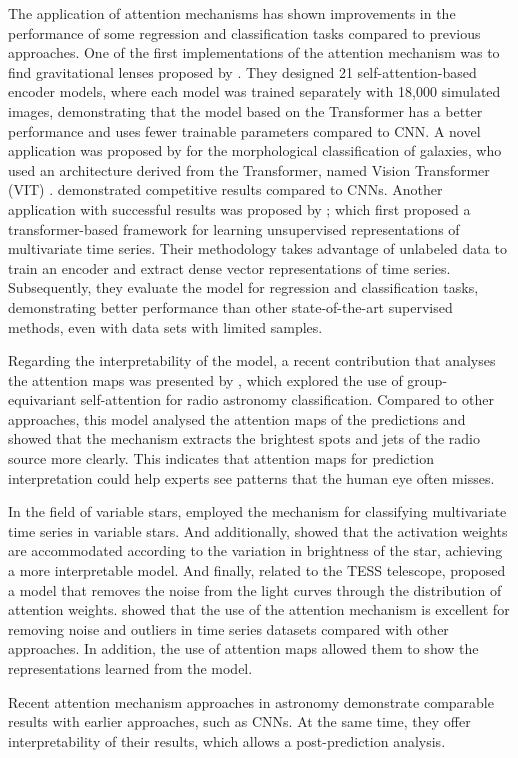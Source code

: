 The application of attention mechanisms has shown improvements in the performance of some regression and classification tasks compared to previous approaches. One of the first implementations of the attention mechanism was to find gravitational lenses proposed by \citet{thuruthipilly2021finding}. They designed 21 self-attention-based encoder models, where each model was trained separately with 18,000 simulated images, demonstrating that the model based on the Transformer has a better performance and uses fewer trainable parameters compared to CNN. A novel application was proposed by \citet{lin2021galaxy} for the morphological classification of galaxies, who used an architecture derived from the Transformer, named Vision Transformer (VIT) \citep{dosovitskiy2020image}. \citet{lin2021galaxy} demonstrated competitive results compared to CNNs. Another application with successful results was proposed by \citet{zerveas2021transformer}; which first proposed a transformer-based framework for learning unsupervised representations of multivariate time series. Their methodology takes advantage of unlabeled data to train an encoder and extract dense vector representations of time series. Subsequently, they evaluate the model for regression and classification tasks, demonstrating better performance than other state-of-the-art supervised methods, even with data sets with limited samples.

Regarding the interpretability of the model, a recent contribution that analyses the attention maps was presented by \citet{bowles20212}, which explored the use of group-equivariant self-attention for radio astronomy classification. Compared to other approaches, this model analysed the attention maps of the predictions and showed that the mechanism extracts the brightest spots and jets of the radio source more clearly. This indicates that attention maps for prediction interpretation could help experts see patterns that the human eye often misses. \par

In the field of variable stars, \citet{allam2021paying} employed the mechanism for classifying multivariate time series in variable stars. And additionally, \citet{allam2021paying} showed that the activation weights are accommodated according to the variation in brightness of the star, achieving a more interpretable model. And finally, related to the TESS telescope, \citet{morvan2022don} proposed a model that removes the noise from the light curves through the distribution of attention weights. \citet{morvan2022don} showed that the use of the attention mechanism is excellent for removing noise and outliers in time series datasets compared with other approaches. In addition, the use of attention maps allowed them to show the representations learned from the model. \par

Recent attention mechanism approaches in astronomy demonstrate comparable results with earlier approaches, such as CNNs. At the same time, they offer interpretability of their results, which allows a post-prediction analysis. \par